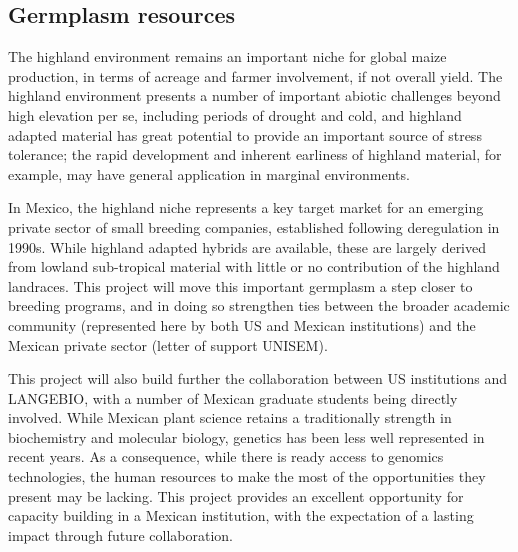 \subsection*{Germplasm resources} %


The highland environment remains an important niche for global maize production, in terms of acreage and farmer involvement, if not overall yield. The highland environment presents a number of important abiotic challenges beyond high elevation per se, including periods of drought and cold, and highland adapted material has great potential to provide an important source of stress tolerance; the rapid development and inherent earliness of highland material, for example, may have general application in marginal environments. 

In Mexico, the highland niche represents a key target market for an emerging private sector of small breeding companies, established following deregulation in 1990s. While highland adapted hybrids are available, these are largely derived from lowland sub-tropical material with little or no contribution of the highland landraces. This project will move this important germplasm a step closer to breeding programs, and in doing so strengthen ties between the broader academic community (represented here by both US and Mexican institutions) and the Mexican private sector (letter of support UNISEM).

This project will also build further the collaboration between US institutions and LANGEBIO, with a number of Mexican graduate students being directly involved. While Mexican plant science retains a traditionally strength in biochemistry and molecular biology, genetics has been less well represented in recent years. As a consequence, while there is ready access to genomics technologies, the human resources to make the most of the opportunities they present may be lacking. This project provides an excellent opportunity for capacity building in a Mexican institution, with the expectation of a lasting impact through future collaboration.



